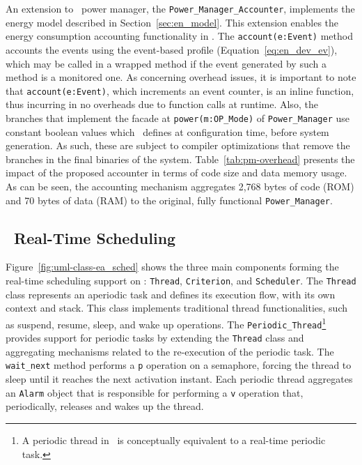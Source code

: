 An extension to \epos~power manager, the \texttt{Power\_Manager\_Accounter}, implements the energy model described in Section~\ref{sec:en_model}.
This extension enables the energy consumption accounting functionality in \epos.
The \texttt{account(e:Event)} method accounts the events using the event-based profile (Equation~\ref{eq:en_dev_ev}), which may be called in a wrapped method if the event generated by such a method is a monitored one.
As concerning overhead issues, it is important to note that \texttt{account(e:Event)}, which increments an event counter, is an inline function, thus incurring in no overheads due to function calls at runtime.
Also, the branches that implement the facade at \texttt{power(m:OP\_Mode)} of \texttt{Power\_Manager} use constant boolean values which \epos~defines at configuration time, before system generation.
As such, these are subject to compiler optimizations that remove the branches in the final binaries of the system.
Table~\ref{tab:pm-overhead} presents the impact of the proposed accounter in terms of code size and data memory usage.
As can be seen, the accounting mechanism aggregates 2,768 bytes of code (ROM) and 70 bytes of data (RAM) to the original, fully functional \texttt{Power\_Manager}.


\subsection{\epos~Real-Time Scheduling}
\label{sec:epossched}

Figure~\ref{fig:uml-class-ea_sched} shows the three main components forming the real-time scheduling support on \epos: \texttt{Thread}, \texttt{Criterion}, and \texttt{Scheduler}.
The \texttt{Thread} class represents an aperiodic task and defines its execution flow, with its own context and stack.
This class implements traditional thread functionalities, such as suspend, resume, sleep, and wake up operations.
The \texttt{Periodic\_Thread}\footnote{A periodic thread in \epos~is conceptually equivalent to a real-time periodic task.} provides support for periodic tasks by extending the \texttt{Thread} class and aggregating mechanisms related to the re-execution of the periodic task.
The \texttt{wait\_next} method performs a \texttt{p} operation on a semaphore, forcing the thread to sleep until it reaches the next activation instant.
Each periodic thread aggregates an \texttt{Alarm} object that is responsible for performing a \texttt{v} operation that, periodically, releases and wakes up the thread.

